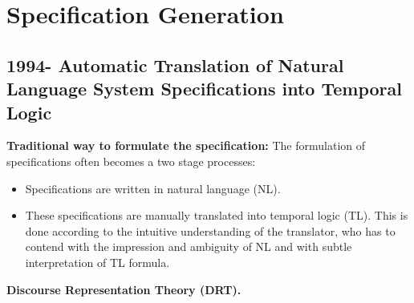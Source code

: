 \section{Specification Generation}

\crule

\subsection{1994- Automatic Translation of Natural Language System 
  Specifications into Temporal Logic \cite{nelken1996automatic}}

\textbf{Traditional way to formulate the specification:}
The formulation of specifications often becomes a two stage processes:
\begin{itemize}
  \item Specifications are written in natural language (NL).
  \item These specifications are manually translated into temporal logic (TL).
    This is done according to the intuitive understanding of the translator,
    who has to contend with the impression and ambiguity of NL and with subtle 
    interpretation of TL formula.
\end{itemize}

\textbf{Discourse Representation Theory (DRT).}

\crule

